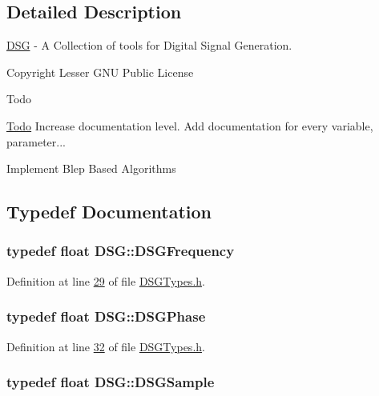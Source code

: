 \subsection{Detailed Description}
\hyperlink{namespace_d_s_g}{D\+S\+G} -\/ A Collection of tools for Digital Signal Generation. 

\begin{DoxyCopyright}{Copyright}
Lesser G\+N\+U Public License 
\end{DoxyCopyright}
\begin{DoxyRefDesc}{Todo}
\item[\hyperlink{todo__todo000006}{Todo}]Increase documentation level. Add documentation for every variable, parameter... 

Implement Blep Based Algorithms \end{DoxyRefDesc}


\subsection{Typedef Documentation}
\hypertarget{namespace_d_s_g_a4315a061386fa1014fda09b15d3a6973}{
\subsubsection[{D\+S\+G\+Frequency}]{\setlength{\rightskip}{0pt plus 5cm}typedef float {\bf D\+S\+G\+::\+D\+S\+G\+Frequency}}}\label{namespace_d_s_g_a4315a061386fa1014fda09b15d3a6973}


Definition at line \hyperlink{_d_s_g_types_8h_source_l00029}{29} of file \hyperlink{_d_s_g_types_8h_source}{D\+S\+G\+Types.\+h}.

\hypertarget{namespace_d_s_g_a44431ce1eb0a7300efdd207bc879e52c}{
\subsubsection[{D\+S\+G\+Phase}]{\setlength{\rightskip}{0pt plus 5cm}typedef float {\bf D\+S\+G\+::\+D\+S\+G\+Phase}}}\label{namespace_d_s_g_a44431ce1eb0a7300efdd207bc879e52c}


Definition at line \hyperlink{_d_s_g_types_8h_source_l00032}{32} of file \hyperlink{_d_s_g_types_8h_source}{D\+S\+G\+Types.\+h}.

\hypertarget{namespace_d_s_g_ac39a94cd27ebcd9c1e7502d0c624894a}{
\subsubsection[{D\+S\+G\+Sample}]{\setlength{\rightskip}{0pt plus 5cm}typedef float {\bf D\+S\+G\+::\+D\+S\+G\+Sample}}}\label{namespace_d_s_g_ac39a94cd27ebcd9c1e7502d0c624894a}


